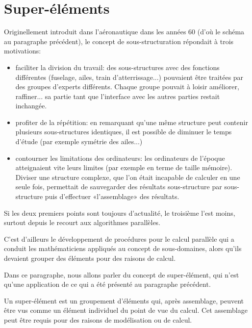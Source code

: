 \medskip
\section{Super-éléments}

\begin{histoire}
Originellement introduit dans l'aéronautique dans les années 60 (d'où le schéma au paragraphe précédent), le concept de sous-structuration répondait à trois motivations:
\begin{itemize}
  \item faciliter la division du travail:
	des sous-structures avec des fonctions différentes (fuselage, ailes, train d'atterrissage...) pouvaient être traitées par des groupes d'experts différents. Chaque groupe pouvait à loisir améliorer, raffiner... sa partie tant que l'interface avec les autres parties restait inchangée.
  \item profiter de la répétition:
	en remarquant qu'une même structure peut contenir plusieurs sous-structures identiques, il est possible de diminuer le temps d'étude (par exemple symétrie des ailes...) 
  \item contourner les limitations des ordinateurs:
	les ordinateurs de l'époque atteignaient vite leurs limites (par exemple en terme de taille mémoire). Diviser une structure complexe, que l'on était incapable de calculer en une seule fois, permettait de sauvegarder des résultats sous-structure par sous-structure puis d'effectuer «l'assemblage» des résultats.
\end{itemize}
Si les deux premiers points sont toujours d'actualité, le troisième l'est moins, surtout depuis le recourt aux algorithmes parallèles.

C'est d'ailleurs le développement de procédures pour le calcul parallèle qui a conduit les mathématiciens appliqués au concept de sous-domaines, alors qu'ils devaient grouper des éléments pour des raisons de calcul.
\end{histoire}

\medskip
Dans ce paragraphe, nous allons parler du concept de super-élément, qui n'est qu'une application de ce qui a été présenté au paragraphe précédent.

\medskip
Un super-élément est un groupement d'éléments qui, après assemblage, peuvent être vus comme un élément individuel du point de vue du calcul. Cet assemblage peut être requis pour des raisons de modélisation ou de calcul.

